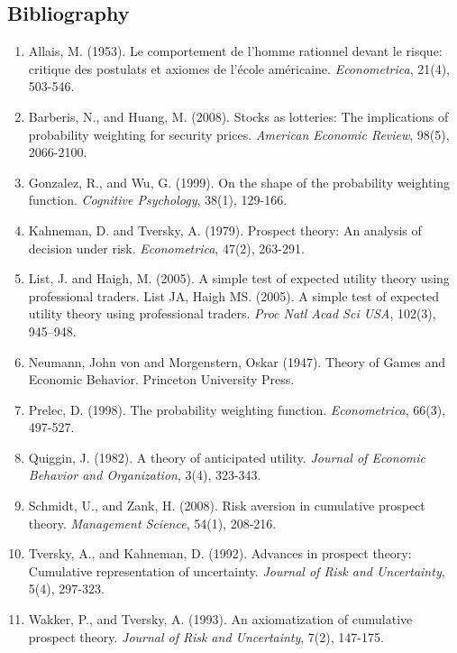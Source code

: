 \documentclass{article}
\begin{document}
\subsection*{Bibliography}
\begin{enumerate}
    \item Allais, M. (1953). Le comportement de l'homme rationnel devant le risque: critique des postulats et axiomes de l'école américaine. \textit{Econometrica}, 21(4), 503-546.
    \item Barberis, N., and Huang, M. (2008). Stocks as lotteries: The implications of probability weighting for security prices. \textit{American Economic Review}, 98(5), 2066-2100.
    \item Gonzalez, R., and Wu, G. (1999). On the shape of the probability weighting function. \textit{Cognitive Psychology}, 38(1), 129-166.
    \item Kahneman, D. and Tversky, A. (1979). Prospect theory: An analysis of decision under risk. \textit{Econometrica}, 47(2), 263-291.
    \item List, J. and Haigh, M. (2005).  A simple test of expected utility theory using professional traders.  List JA, Haigh MS. (2005). A simple test of expected utility theory using professional traders. \textit{Proc Natl Acad Sci USA}, 102(3), 945–948.
    \item Neumann, John von and Morgenstern, Oskar (1947). Theory of Games and Economic Behavior. Princeton University Press.
    \item Prelec, D. (1998). The probability weighting function. \textit{Econometrica}, 66(3), 497-527.
    \item Quiggin, J. (1982). A theory of anticipated utility. \textit{Journal of Economic Behavior and Organization}, 3(4), 323-343.
    \item Schmidt, U., and Zank, H. (2008). Risk aversion in cumulative prospect theory. \textit{Management Science}, 54(1), 208-216.
    \item Tversky, A., and Kahneman, D. (1992). Advances in prospect theory: Cumulative representation of uncertainty. \textit{Journal of Risk and Uncertainty}, 5(4), 297-323.
    \item Wakker, P., and Tversky, A. (1993). An axiomatization of cumulative prospect theory. \textit{Journal of Risk and Uncertainty}, 7(2), 147-175.

\end{enumerate}
\end{document}
